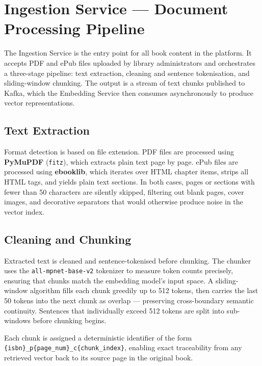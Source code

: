\section{Ingestion Service --- Document Processing Pipeline}
\label{sec:ingestion}

The Ingestion Service is the entry point for all book content in the platform.
It accepts PDF and ePub files uploaded by library administrators and
orchestrates a three-stage pipeline: text extraction, cleaning and sentence
tokenisation, and sliding-window chunking. The output is a stream of text
chunks published to Kafka, which the Embedding Service then consumes
asynchronously to produce vector representations.

\subsection{Text Extraction}

Format detection is based on file extension. PDF files are processed using
\textbf{PyMuPDF} (\texttt{fitz}), which extracts plain text page by page.
ePub files are processed using \textbf{ebooklib}, which iterates over HTML
chapter items, strips all HTML tags, and yields plain text sections. In both
cases, pages or sections with fewer than 50 characters are silently skipped,
filtering out blank pages, cover images, and decorative separators that would
otherwise produce noise in the vector index.

\subsection{Cleaning and Chunking}

Extracted text is cleaned and sentence-tokenised before chunking. The chunker
uses the \texttt{all-mpnet-base-v2} tokenizer to measure token counts
precisely, ensuring that chunks match the embedding model's input space. A
sliding-window algorithm fills each chunk greedily up to 512 tokens, then
carries the last 50 tokens into the next chunk as overlap --- preserving
cross-boundary semantic continuity. Sentences that individually exceed 512
tokens are split into sub-windows before chunking begins.

Each chunk is assigned a deterministic identifier of the form
\texttt{\{isbn\}\_p\{page\_num\}\_c\{chunk\_index\}}, enabling exact
traceability from any retrieved vector back to its source page in the original
book.

